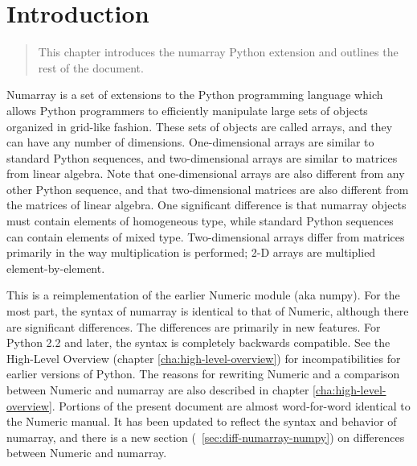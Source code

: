 \chapter{Introduction}
\label{cha:introduction}

\begin{quote}
   This chapter introduces the numarray Python extension and outlines the rest
   of the document.
\end{quote}

Numarray is a set of extensions to the Python programming language which allows
Python programmers to efficiently manipulate large sets of objects organized in
grid-like fashion. These sets of objects are called arrays, and they can have
any number of dimensions. One-dimensional arrays are similar to standard Python
sequences, and two-dimensional arrays are similar to matrices from linear
algebra. Note that one-dimensional arrays are also different from any other
Python sequence, and that two-dimensional matrices are also different from the
matrices of linear algebra. One significant difference is that numarray objects
must contain elements of homogeneous type, while standard Python sequences can
contain elements of mixed type. Two-dimensional arrays differ from matrices
primarily in the way multiplication is performed; 2-D arrays are multiplied
element-by-element.

This is a reimplementation of the earlier Numeric module (aka numpy). For the
most part, the syntax of numarray is identical to that of Numeric, although
there are significant differences. The differences are primarily in new
features. For Python 2.2 and later, the syntax is completely backwards
compatible. See the High-Level Overview (chapter \ref{cha:high-level-overview})
for incompatibilities for earlier versions of Python. The reasons for rewriting
Numeric and a comparison between Numeric and numarray are also described in
chapter \ref{cha:high-level-overview}. Portions of the present document are
almost word-for-word identical to the Numeric manual. It has been updated to
reflect the syntax and behavior of numarray, and there is a new section
(~\ref{sec:diff-numarray-numpy}) on differences between Numeric and numarray.

